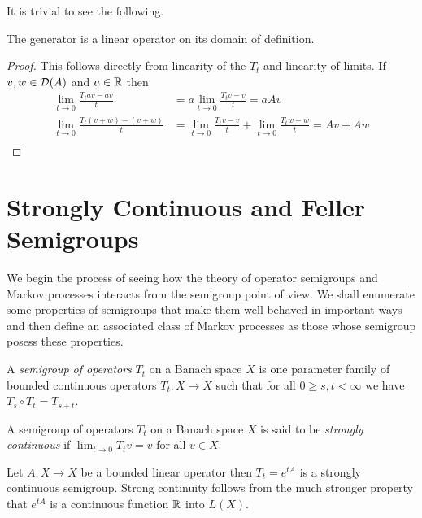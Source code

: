 It is trivial to see the following.
\begin{prop}The generator is a linear operator on its domain of definition.
\end{prop}
\begin{proof}
This follows directly from linearity of the $T_t$ and linearity of limits.  If $v,w \in \mathcal{D}(A)$ and $a \in \mathbb{R}$ then
\begin{align*}
\lim_{t \to 0} \frac{T_t av - av}{t} &= a \lim_{t \to 0} \frac{T_t v - v}{t} = aAv \\
\lim_{t \to 0} \frac{T_t (v+w) - (v+w)}{t} &= \lim_{t \to 0} \frac{T_t v - v}{t} + \lim_{t \to 0} \frac{T_t w - w}{t}= Av + Aw \\
\end{align*}
\end{proof}

\section{Strongly Continuous and Feller Semigroups}

We begin the process of seeing how the theory of operator semigroups and Markov processes interacts from the semigroup point of view.  We shall enumerate some properties of
semigroups that make them well behaved in important ways and then define an associated class of Markov processes  as those whose semigroup posess these properties.

\begin{defn}A \emph{semigroup of operators} $T_t$ on a Banach space $X$ is one parameter family of bounded continuous operators $T_t : X \to X$ such that
for all $0 \geq s,t < \infty$ we have $T_s \circ T_t = T_{s+t}$.
\end{defn}

\begin{defn}A semigroup of operators $T_t$ on a Banach space $X$ is said to be \emph{strongly continuous} if $\lim_{t \to 0} T_tv = v$ for all $v \in X$.
\end{defn}

\begin{examp}\label{ExponentialOfBoundedStronglyContinuousSemigroup}Let $A : X \to X$ be a bounded linear operator then $T_t = e^{tA}$ is a strongly continuous semigroup.  Strong continuity follows from the much stronger property that
$e^{tA}$ is a continuous function $\mathbb{R}$ into $L(X)$.
\end{examp}

